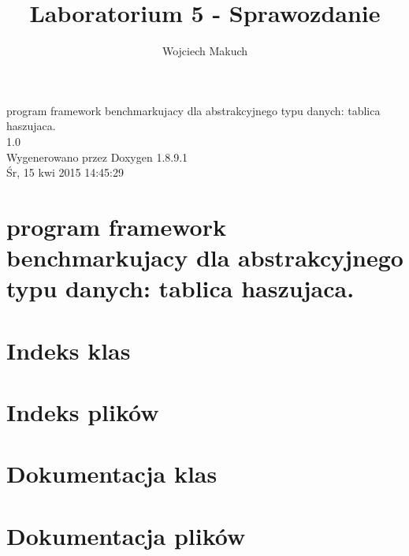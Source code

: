\documentclass[twoside]{article}
\newcommand{\+}{\discretionary{\mbox{\scriptsize$\hookleftarrow$}}{}{}}
\begin{document}
\hypersetup{pageanchor=false,
             bookmarks=true,
             bookmarksnumbered=true,
             pdfencoding=unicode
            }
\begin{titlepage}
\vspace*{7cm}
\begin{center}%
{\Large program framework benchmarkujacy dla abstrakcyjnego typu danych\+: tablica haszujaca. \\[1ex]\large 1.\+0 }\\
\vspace*{1cm}
{\large Wygenerowano przez Doxygen 1.8.9.1}\\
\vspace*{0.5cm}
{\small Śr, 15 kwi 2015 14:45:29}\\
\end{center}
\end{titlepage}
\tableofcontents
{}
\hypersetup{pageanchor=true}

\section{program framework benchmarkujacy dla abstrakcyjnego typu danych\+: tablica haszujaca.}
\label{index}\hypertarget{index}{}
\section{Indeks klas}

\section{Indeks plików}

\section{Dokumentacja klas}


\section{Dokumentacja plików}









\title{Laboratorium 5 - Sprawozdanie}
\author{Wojciech Makuch}


\maketitle
\end{document}
